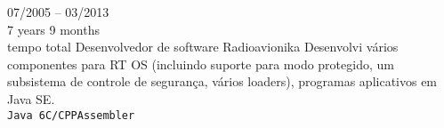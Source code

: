 \begin{entrylist}
    \entry
    {07/2005 -- 03/2013\\\footnotesize{7 years 9 months\\tempo total}}
    {Desenvolvedor de software}
    {Radioavionika}
    {
        Desenvolvi vários componentes para RT OS (incluindo suporte para modo protegido, um subsistema de controle de segurança, vários loaders), programas aplicativos em Java SE. \\
    \texttt{Java 6}\slashsep\texttt{C/CPP}\slashsep\texttt{Assembler}}

\end{entrylist}

